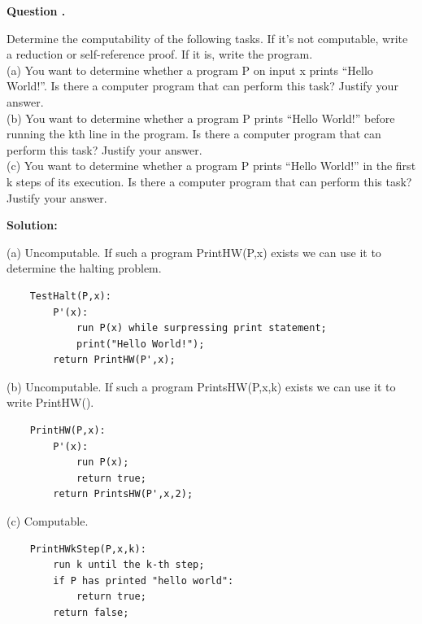 \documentclass[12pt]{article}
\newcounter{questionnumber}
\newenvironment{question}[1][]{\stepcounter{questionnumber}\par\noindent\textbf{Question \thequestionnumber. #1}\par}{\par}
\newenvironment{solution}{\par\noindent\textbf{Solution:}\par}{\par\vspace{1em}}
\begin{document}
\begin{question}
    Determine the computability of the following tasks. If it's not computable, write a reduction or self-reference proof. If it is, write the program.\\
    (a) You want to determine whether a program P on input x prints ``Hello World!''. Is there a computer program that can perform this task? Justify your answer.\\
    (b) You want to determine whether a program P prints ``Hello World!'' before running the kth line in the program. Is there a computer program that can perform this task? Justify your answer.\\
    (c) You want to determine whether a program P prints ``Hello World!'' in the first k steps of its execution. Is there a computer program that can perform this task? Justify your answer.
\end{question}
\begin{solution}
    \noindent
    (a) Uncomputable. If such a program PrintHW(P,x) exists we can use it to determine the halting problem.
    \begin{lstlisting}
    TestHalt(P,x):
        P'(x):
            run P(x) while surpressing print statement;
            print("Hello World!");
        return PrintHW(P',x);
    \end{lstlisting}
    (b) Uncomputable. If such a program PrintsHW(P,x,k) exists we can use it to write PrintHW().
    \begin{lstlisting}
    PrintHW(P,x):
        P'(x):
            run P(x);
            return true;
        return PrintsHW(P',x,2);
    \end{lstlisting}
    (c) Computable.
    \begin{lstlisting}
    PrintHWkStep(P,x,k):
        run k until the k-th step;
        if P has printed "hello world":
            return true;
        return false;
    \end{lstlisting}
\end{solution}
\end{document}

